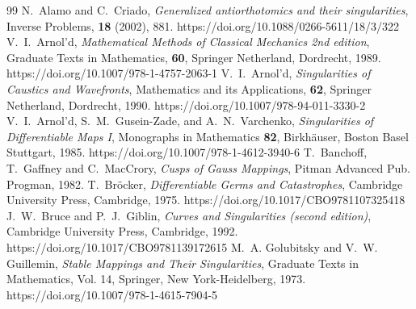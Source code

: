 \documentclass{amsart}
\theoremstyle{definition}
\theoremstyle{definition}
\theoremstyle{definition}
\begin{document}
{%
%
%
%
\begin{thebibliography}{99}
N.~Alamo and C.~Criado, 
\emph{Generalized antiorthotomics and their singularities}, 
Inverse Problems, {\bf 18} (2002), 881.     
https://doi.org/10.1088/0266-5611/18/3/322
V.~I.~Arnol'd, 
\emph{Mathematical Methods of Classical Mechanics 2nd edition}, 
Graduate Texts in Mathematics, {\bf 60},  
Springer Netherland, Dordrecht, 1989.  
https://doi.org/10.1007/978-1-4757-2063-1 
V.~I.~Arnol'd,
\emph{Singularities of Caustics and Wavefronts},
Mathematics and its Applications, {\bf 62},
Springer Netherland, Dordrecht, 1990.
https://doi.org/10.1007/978-94-011-3330-2
V.~I.~Arnol'd, S.~M.~Gusein-Zade,
and A.~N.~Varchenko,
\emph{Singularities of Differentiable Maps I},
Monographs in Mathematics {\bf 82}, Birkh\"auser,
Boston Basel Stuttgart, 1985.
https://doi.org/10.1007/978-1-4612-3940-6
T.~Banchoff, T.~Gaffney and C.~MacCrory,
\emph{Cusps of Gauss Mappings},
Pitman Advanced Pub. Progman, 1982.
T.~Br\"{o}cker,
\emph{Differentiable Germs and Catastrophes},
Cambridge University Press, Cambridge, 1975.
https://doi.org/10.1017/CBO9781107325418
J.~W.~Bruce and P.~J.~Giblin,
\emph{Curves and Singularities (second edition)},
Cambridge University Press, Cambridge, 1992.
https://doi.org/10.1017/CBO9781139172615
{M.~A. Golubitsky and V.~W. Guillemin, 
{\it Stable Mappings and Their Singularities}, 
Graduate Texts in Mathematics, Vol. 14, Springer, New York-Heidelberg, 1973}.    
{\color{black}https://doi.org/10.1007/978-1-4615-7904-5}

\end{thebibliography}}
\end{document}
